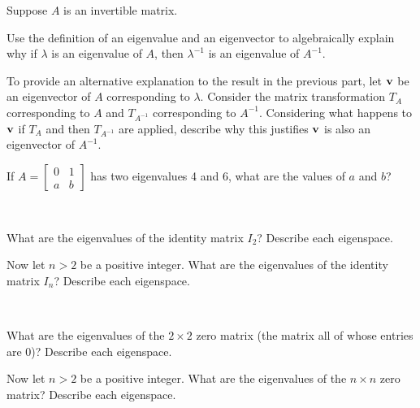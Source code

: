 \item Suppose $A$ is an invertible matrix. 

	\ba 
	\item Use the definition of an eigenvalue and an eigenvector to algebraically explain why if $\lambda$ is an eigenvalue of $A$, then $\lambda^{-1}$ is an eigenvalue of $A^{-1}$. 

	\item To provide an alternative explanation to the result in the previous part, let $\mathbf{v}$ be an eigenvector of $A$ corresponding to $\lambda$. Consider the matrix transformation $T_A$ corresponding to $A$ and $T_{A^{-1}}$ corresponding to $A^{-1}$. Considering what happens to $\mathbf{v}$ if $T_A$ and then $T_{A^{-1}}$ are applied, describe why this justifies $\mathbf{v}$ is also an eigenvector of $A^{-1}$.
	\ea

\item If $A=\left[ \begin{array}{cc} 0&1\\a&b \end{array} \right]$ has two eigenvalues 4 and 6, what are the values of $a$ and $b$?

\item ~
	\ba
	\item What are the eigenvalues of the identity matrix $I_2$? Describe each eigenspace.
	\item Now let $n > 2$ be a positive integer. What are the eigenvalues of the identity matrix $I_n$? Describe each eigenspace.
	\ea

\item ~
	\ba
	\item What are the eigenvalues of the $2 \times 2$ zero matrix (the matrix all of whose entries are 0)? Describe each eigenspace.
	\item Now let $n > 2$ be a positive integer. What are the eigenvalues of the $n \times n$ zero matrix? Describe each eigenspace.
	\ea
	
	

